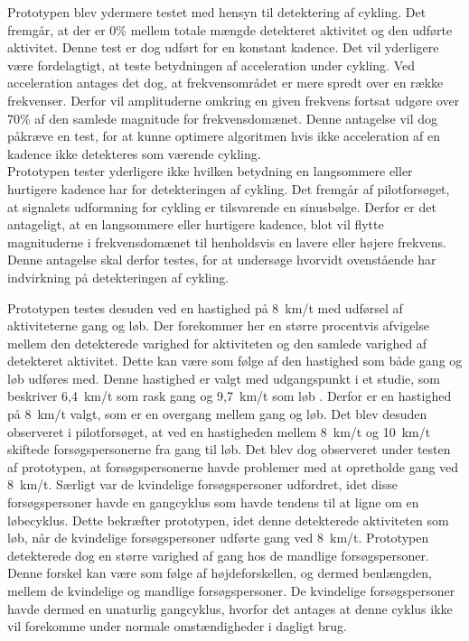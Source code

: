 Prototypen blev ydermere testet med hensyn til detektering af cykling. Det fremgår, at der er 0\% mellem totale mængde detekteret aktivitet og den udførte aktivitet. Denne test er dog udført for en konstant kadence. Det vil yderligere være fordelagtigt, at teste betydningen af acceleration under cykling. Ved acceleration antages det dog, at frekvensområdet er mere spredt over en række frekvenser. Derfor vil amplituderne omkring en given frekvens fortsat udgøre over 70\% af den samlede magnitude for frekvensdomænet. Denne antagelse vil dog påkræve en test, for at kunne optimere algoritmen hvis ikke acceleration af en kadence ikke detekteres som værende cykling. \\
Prototypen tester yderligere ikke hvilken betydning en langsommere eller hurtigere kadence har for detekteringen af cykling. Det fremgår af pilotforsøget, at signalets udformning for cykling er tilsvarende en sinusbølge. Derfor er det antageligt, at en langsommere eller hurtigere kadence, blot vil flytte magnituderne i frekvensdomænet til henholdsvis en lavere eller højere frekvens. Denne antagelse skal derfor testes, for at undersøge hvorvidt ovenstående har indvirkning på detekteringen af cykling. 

Prototypen testes desuden ved en hastighed på 8~km/t med udførsel af aktiviteterne gang og løb. Der forekommer her en større procentvis afvigelse mellem den detekterede varighed for aktiviteten og den samlede varighed af detekteret aktivitet. Dette kan være som følge af den hastighed som både gang og løb udføres med. Denne hastighed er valgt med udgangspunkt i et studie, som beskriver 6,4~km/t som rask gang og 9,7~km/t som løb \citep{Miles2007}. Derfor er en hastighed på 8~km/t valgt, som er en overgang mellem gang og løb. Det blev desuden observeret i pilotforsøget, at ved en hastigheden mellem 8~km/t og 10~km/t skiftede forsøgspersonerne fra gang til løb. Det blev dog observeret under testen af prototypen, at forsøgspersonerne havde problemer med at opretholde gang ved 8~km/t. Særligt var de kvindelige forsøgspersoner udfordret, idet disse forsøgspersoner havde en gangcyklus som havde tendens til at ligne om en løbecyklus. Dette bekræfter prototypen, idet denne detekterede aktiviteten som løb, når de kvindelige forsøgspersoner udførte gang ved 8~km/t. Prototypen detekterede dog en større varighed af gang hos de mandlige forsøgspersoner. Denne forskel kan være som følge af højdeforskellen, og dermed benlængden, mellem de kvindelige og mandlige forsøgspersoner. De kvindelige forsøgspersoner havde dermed en unaturlig gangcyklus, hvorfor det antages at denne cyklus ikke vil forekomme under normale omstændigheder i dagligt brug.
